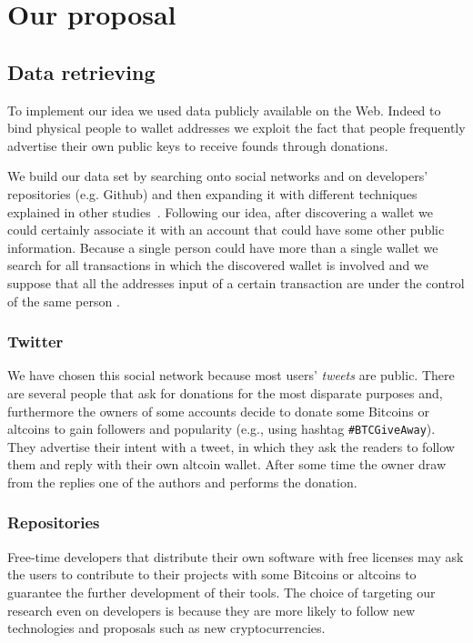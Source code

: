 \section{Our proposal}
\label{proposal}

\subsection{Data retrieving}
To implement our idea we used data publicly available on the Web. Indeed
to bind physical people to wallet addresses we exploit the fact that
people frequently advertise their own public keys to receive founds
through donations.

We build our data set by searching onto social networks and on developers'
repositories (e.g. Github) and then expanding it with different techniques
explained in other studies~\cite{bib:fistful}. Following our idea, after
discovering a wallet we could certainly associate it with an account that could
have some other public information. Because a single person could have more
than a single wallet we search for all transactions in which the
discovered wallet is involved
and we suppose that all the addresses input of a certain transaction are under
the control of the same person \cite{bib:satoshi, bib:deanon, bib:fistful}.

\subsubsection*{Twitter}
We have chosen this social network because most users' \textit{tweets} are
public. There are several people that ask for donations for the most disparate
purposes and, furthermore the owners of some accounts decide to donate some
Bitcoins or altcoins to gain followers and popularity (e.g., using hashtag
\texttt{\#BTCGiveAway}). They advertise their intent with a tweet, in which
they ask the readers to follow them and reply with their own altcoin wallet.
After some time the owner draw from the replies one of the authors and performs
the donation.

\subsubsection*{Repositories}
Free-time developers that distribute their own software with free licenses may
ask the users to contribute to their projects with some Bitcoins or altcoins to
guarantee the further development of their tools. The choice of targeting our
research even on developers is because they are more likely to follow new
technologies and proposals such as new cryptocurrencies.

